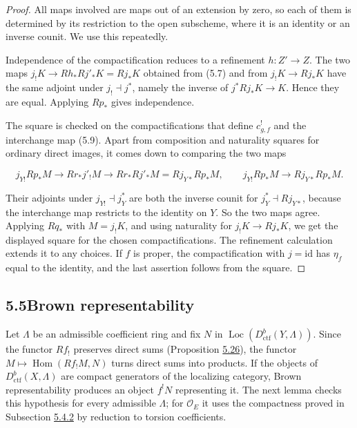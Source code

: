 \documentclass[11pt]{article}
\providecommand{\Hom}{}\renewcommand{\Hom}{\operatorname{Hom}}
\providecommand{\Loc}{}\renewcommand{\Loc}{\operatorname{Loc}}
\begin{document}
\begin{proof}[{Proof}]\label{bp94}%
All maps involved are maps out of an extension by zero, so each of them is determined by its restriction to the open subscheme, where it is an identity or an inverse counit. We use this repeatedly.

Independence of the compactification reduces to a refinement \(h:Z'\to Z\). The two maps \(j_!K\to Rh_*Rj'_*K=Rj_*K\) obtained from (5.7) and from \(j_!K\to Rj_*K\) have the same adjoint under \(j_!\dashv j^*\), namely the inverse of \(j^*Rj_*K\to K\). Hence they are equal. Applying \(Rp_*\) gives independence.

The square is checked on the compactifications that define \(c^!_{g,f}\) and the interchange map (5.9). Apart from composition and naturality squares for ordinary direct images, it comes down to comparing the two maps

\[
j_{Y!}Rp_*M\longrightarrow Rr_*j'_!M
\longrightarrow Rr_*Rj'_*M=Rj_{Y*}Rp_*M,
\qquad
j_{Y!}Rp_*M\longrightarrow Rj_{Y*}Rp_*M.
\]

Their adjoints under \(j_{Y!}\dashv j_Y^*\) are both the inverse counit for \(j_Y^*\dashv Rj_{Y*}\), because the interchange map restricts to the identity on \(Y\). So the two maps agree. Applying \(Rq_*\) with \(M=j_!K\), and using naturality for \(j_!K\to Rj_*K\), we get the displayed square for the chosen compactifications. The refinement calculation extends it to any choices. If \(f\) is proper, the compactification with \(j=\mathrm{id}\) has \(\eta_f\) equal to the identity, and the last assertion follows from the square.
\end{proof}



\subsection*{\texorpdfstring{5.5\quad Brown representability}{5.5 Brown representability}}
\label{bp95}%
\label{bp96}%
Let \(\Lambda\) be an admissible coefficient ring and fix \(N\) in \(\Loc(D^b_{\mathrm{ctf}}(Y,\Lambda))\). Since the functor \(Rf_!\) preserves direct sums (Proposition \hyperref[bp86]{5.26}), the functor \(M\mapsto\Hom(Rf_!M,N)\) turns direct sums into products. If the objects of \(D^b_{\mathrm{ctf}}(X,\Lambda)\) are compact generators of the localizing category, Brown representability produces an object \(f^!N\) representing it. The next lemma checks this hypothesis for every admissible \(\Lambda\); for \(\mathcal O_E\) it uses the compactness proved in Subsection \hyperref[bp63]{5.4.2} by reduction to torsion coefficients.
\end{document}

